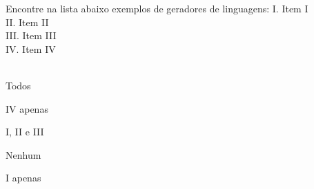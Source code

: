\question[10]
Encontre na lista abaixo exemplos de geradores de linguagens:
I. Item I\\
II. Item II\\
III. Item III\\
IV. Item IV\\
\\
\begin{choices}
\item Todos
\item IV apenas
\item I, II e III
\item Nenhum
\item I apenas %
\end{choices}
\answerline

